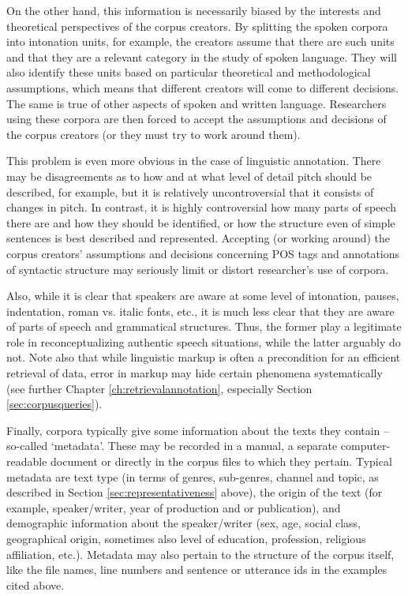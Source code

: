 On the other hand, this information is necessarily biased by the interests and theoretical perspectives of the corpus creators. By splitting the spoken corpora into intonation units, for example, the creators assume that there are such units and that they are a relevant category in the study of spoken language. They will also identify these units based on particular theoretical and methodological assumptions, which means that different creators will come to different decisions. The same is true of other aspects of spoken and written language. Researchers using these corpora are then forced to accept the assumptions and decisions of the corpus creators (or they must try to work around them).

This problem is even more obvious in the case of linguistic annotation. There may be disagreements as to how and at what level of detail pitch should be described, for example, but it is relatively uncontroversial that it consists of changes in pitch. In contrast, it is highly controversial how many parts of speech there are and how they should be identified, or how the structure even of simple sentences is best described and represented. Accepting (or working around) the corpus creators' assumptions and decisions concerning POS tags and annotations of syntactic structure may seriously limit or distort researcher's use of corpora.

Also, while it is clear that speakers are aware at some level of intonation, pauses, indentation, roman vs. italic fonts, etc., it is much less clear that they are aware of parts of speech and grammatical structures. Thus, the former play a legitimate role in reconceptualizing authentic speech situations, while the latter arguably do not. Note also that while linguistic markup is often a precondition for an efficient retrieval of data, error in markup may hide certain phenomena systematically (see further Chapter \ref{ch:retrievalannotation}, especially Section \ref{sec:corpusqueries}).

Finally, corpora typically give some information about the texts they contain -- so-called `metadata'. These may be recorded in a manual, a separate computer\hyp{}readable document or directly in the corpus files to which they pertain. Typical metadata are text type (in terms of genres, sub-genres, channel and topic, as described in Section \ref{sec:representativeness} above), the origin of the text (for example, speaker/writer, year of production and or publication), and demographic information about the speaker/writer (sex, age, social class, geographical origin, sometimes also level of education, profession, religious affiliation, etc.). Metadata may also pertain to the structure of the corpus itself, like the file names, line numbers and sentence or utterance ids in the examples cited above.

